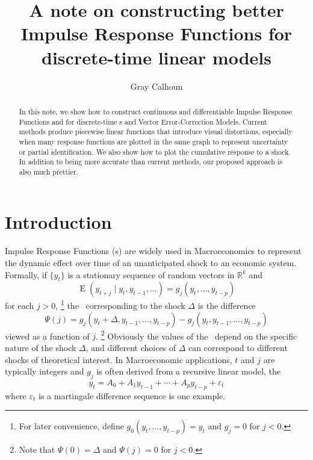 \documentclass[12pt,fleqn]{article}
\title{A note on constructing better Impulse Response Functions for
  discrete-time linear models}
\author{Gray Calhoun}
\DeclareMathOperator{\E}{E}
\newcommand{\vep}{\varepsilon}
\newcommand{\RR}{\mathbb{R}}
\begin{document}
\maketitle
\begin{abstract}\noindent%
  In this note, we show how to construct continuous and differentiable
  Impulse Response Functions and for discrete-time \VAR s and Vector
  Error-Correction Models. Current methods produce piecewise linear
  functions that introduce visual distortions, especially when many
  response functions are plotted in the same graph to represent
  uncertainty or partial identification. We also show how to plot the
  cumulative response to a shock. In addition to being more accurate
  than current methods, our proposed approach is also much prettier.
\end{abstract}

\section{Introduction}

Impulse Response Functions (\IRF s) are widely used in Macroeconomics
to represent the dynamic effect over time of an unanticipated shock to
an economic system. Formally, if $\{y_t\}$ is a stationary sequence of
random vectors in $\RR^k$ and
\[
\E(y_{t+j} \mid y_t, y_{t-1},\dots) = g_j(y_t,\dots,y_{t-p})
\]
for each $j > 0$,%
\footnote{For later convenience, define
  $g_0(y_t,\dots,y_{t-p}) = y_t$ and $g_j = 0$ for $j < 0$.} %
the \IRF\ corresponding to the shock $\Delta$ is the difference
\[
\Psi(j) = g_j(y_t + \Delta, y_{t-1},\dots,y_{t-p}) - g_j(y_t, y_{t-1},\dots,y_{t-p})
\]
viewed as a function of $j$.%
\footnote{Note that $\Psi(0) = \Delta$ and $\Psi(j) = 0$ for $j <
  0$.} %
Obviously the values of the \IRF\ depend on the specific nature of the
shock $\Delta$, and different choices of $\Delta$ can correspond to
different shocks of theoretical interest.  In Macroeconomic
applications, $t$ and $j$ are typically integers and $g_j$ is often
derived from a recursive linear model, the \VAR
\begin{equation}\label{eq:1}
  y_t = A_0 + A_1 y_{t-1} + \cdots + A_p y_{t-p} + \vep_t
\end{equation}
where $\vep_t$ is a martingale difference sequence is one example.
\end{document}
